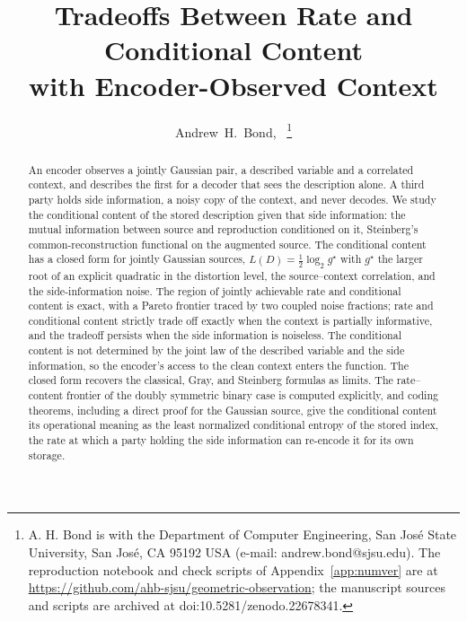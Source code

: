 \documentclass[11pt,onecolumn]{IEEEtran}
\begin{document}
\title{Tradeoffs Between Rate and Conditional Content\\ with Encoder-Observed Context}

\author{Andrew~H.~Bond,~%
\thanks{A. H. Bond is with the Department of Computer Engineering, San Jos\'e
State University, San Jos\'e, CA 95192 USA (e-mail: andrew.bond@sjsu.edu).
The reproduction notebook and check scripts of Appendix~\ref{app:numver}
are at \url{https://github.com/ahb-sjsu/geometric-observation}; the manuscript
sources and scripts are archived at doi:10.5281/zenodo.22678341.}}


\maketitle

\begin{abstract}
An encoder observes a jointly Gaussian pair, a described variable and a
correlated context, and describes the first for a decoder that sees the
description alone. A third party holds side information, a noisy copy of
the context, and never decodes. We study the conditional content of the
stored description given that side information: the mutual information
between source and reproduction conditioned on it, Steinberg's
common-reconstruction functional on the augmented source.
The conditional content has a closed form for
jointly Gaussian sources, $L(D)=\tfrac12\log_2 g^\star$ with $g^\star$
the larger root of an explicit quadratic in the distortion level, the
source--context correlation, and the side-information noise.
The region of jointly achievable rate and conditional content is
exact, with a Pareto frontier traced by two coupled noise fractions; rate
and conditional content strictly trade off exactly when the context is
partially informative, and the tradeoff persists when the side information
is noiseless. The conditional content is not determined by the joint law
of the described variable and the side information, so the encoder's
access to the clean context enters the function. The closed form recovers the classical,
Gray, and Steinberg formulas as limits. The rate--content frontier of the
doubly symmetric binary case is computed explicitly, and coding theorems,
including a direct proof for the Gaussian source, give the conditional
content its operational meaning as the least normalized conditional
entropy of the stored index, the rate at which a party holding the side
information can re-encode it for its own storage.
\end{abstract}
\end{document}
